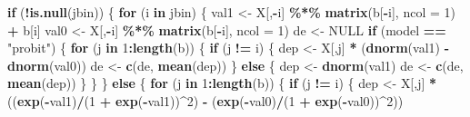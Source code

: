 \documentclass[
  12pt,
]{article}
\newenvironment{Shaded}{\begin{snugshade}}{\end{snugshade}}
\newcommand{\ControlFlowTok}[1]{\textcolor[rgb]{0.13,0.29,0.53}{\textbf{#1}}}
\newcommand{\DataTypeTok}[1]{\textcolor[rgb]{0.13,0.29,0.53}{#1}}
\newcommand{\DecValTok}[1]{\textcolor[rgb]{0.00,0.00,0.81}{#1}}
\newcommand{\KeywordTok}[1]{\textcolor[rgb]{0.13,0.29,0.53}{\textbf{#1}}}
\newcommand{\NormalTok}[1]{#1}
\newcommand{\OperatorTok}[1]{\textcolor[rgb]{0.81,0.36,0.00}{\textbf{#1}}}
\newcommand{\OtherTok}[1]{\textcolor[rgb]{0.56,0.35,0.01}{#1}}
\newcommand{\StringTok}[1]{\textcolor[rgb]{0.31,0.60,0.02}{#1}}
\begin{document}
\begin{Shaded}
\begin{Highlighting}[]
  \ControlFlowTok{if}\NormalTok{ (}\OperatorTok{!}\KeywordTok{is.null}\NormalTok{(jbin)) \{}
    \ControlFlowTok{for}\NormalTok{ (i }\ControlFlowTok{in}\NormalTok{ jbin) \{}
\NormalTok{      val1 \textless{}{-}}\StringTok{ }\NormalTok{X[,}\OperatorTok{{-}}\NormalTok{i] }\OperatorTok{\%*\%}\StringTok{ }\KeywordTok{matrix}\NormalTok{(b[}\OperatorTok{{-}}\NormalTok{i], }\DataTypeTok{ncol =} \DecValTok{1}\NormalTok{) }\OperatorTok{+}\StringTok{ }\NormalTok{b[i]}
\NormalTok{      val0 \textless{}{-}}\StringTok{ }\NormalTok{X[,}\OperatorTok{{-}}\NormalTok{i] }\OperatorTok{\%*\%}\StringTok{ }\KeywordTok{matrix}\NormalTok{(b[}\OperatorTok{{-}}\NormalTok{i], }\DataTypeTok{ncol =} \DecValTok{1}\NormalTok{)}
\NormalTok{      de \textless{}{-}}\StringTok{ }\OtherTok{NULL}
      \ControlFlowTok{if}\NormalTok{ (model }\OperatorTok{==}\StringTok{ "probit"}\NormalTok{) \{}
        \ControlFlowTok{for}\NormalTok{ (j }\ControlFlowTok{in} \DecValTok{1}\OperatorTok{:}\KeywordTok{length}\NormalTok{(b)) \{}
           \ControlFlowTok{if}\NormalTok{ (j }\OperatorTok{!=}\StringTok{ }\NormalTok{i) \{}
\NormalTok{            dep \textless{}{-}}\StringTok{ }\NormalTok{X[,j] }\OperatorTok{*}\StringTok{ }\NormalTok{(}\KeywordTok{dnorm}\NormalTok{(val1) }\OperatorTok{{-}}\StringTok{ }\KeywordTok{dnorm}\NormalTok{(val0))}
\NormalTok{            de \textless{}{-}}\StringTok{ }\KeywordTok{c}\NormalTok{(de, }\KeywordTok{mean}\NormalTok{(dep))}
\NormalTok{           \} }\ControlFlowTok{else}\NormalTok{ \{}
\NormalTok{            dep \textless{}{-}}\StringTok{ }\KeywordTok{dnorm}\NormalTok{(val1)}
\NormalTok{            de \textless{}{-}}\StringTok{ }\KeywordTok{c}\NormalTok{(de, }\KeywordTok{mean}\NormalTok{(dep))}
\NormalTok{           \}}
\NormalTok{        \}        }
\NormalTok{      \} }\ControlFlowTok{else}\NormalTok{ \{}
        \ControlFlowTok{for}\NormalTok{ (j }\ControlFlowTok{in} \DecValTok{1}\OperatorTok{:}\KeywordTok{length}\NormalTok{(b)) \{}
           \ControlFlowTok{if}\NormalTok{ (j }\OperatorTok{!=}\StringTok{ }\NormalTok{i) \{}
\NormalTok{            dep \textless{}{-}}\StringTok{ }\NormalTok{X[,j] }\OperatorTok{*}\StringTok{ }
\StringTok{              }\NormalTok{((}\KeywordTok{exp}\NormalTok{(}\OperatorTok{{-}}\NormalTok{val1)}\OperatorTok{/}\NormalTok{(}\DecValTok{1} \OperatorTok{+}\StringTok{ }\KeywordTok{exp}\NormalTok{(}\OperatorTok{{-}}\NormalTok{val1))}\OperatorTok{\^{}}\DecValTok{2}\NormalTok{) }\OperatorTok{{-}}\StringTok{ }\NormalTok{(}\KeywordTok{exp}\NormalTok{(}\OperatorTok{{-}}\NormalTok{val0)}\OperatorTok{/}\NormalTok{(}\DecValTok{1} \OperatorTok{+}\StringTok{ }\KeywordTok{exp}\NormalTok{(}\OperatorTok{{-}}\NormalTok{val0))}\OperatorTok{\^{}}\DecValTok{2}\NormalTok{))}

\end{Highlighting}
\end{Shaded}
\end{document}
